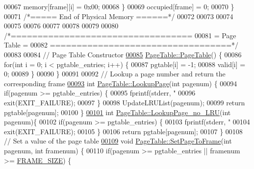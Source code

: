 \begin{DoxyCode}
{{{{00067         memory[frame][i] = 0x00;
00068     \}
00069     occupied[frame] = 0;
00070 \}
00071 \textcolor{comment}{/*=====  End of Physical Memory  ======*/}
00072 
00073 
00074 
00075 
00076 
00077 
00078 
00079 
00080 \textcolor{comment}{/*==================================}
00081 \textcolor{comment}{=            Page Table            =}
00082 \textcolor{comment}{==================================*/}
00083 
00084 \textcolor{comment}{// Page Table Constructor}
\hypertarget{memory_8cpp_source.tex_l00085}{}\hyperlink{classPageTable_a75c92e794fd3f5397d2499d54dac22c9}{00085} \hyperlink{classPageTable_a75c92e794fd3f5397d2499d54dac22c9}{PageTable::PageTable}() \{
00086     \textcolor{keywordflow}{for}(\textcolor{keywordtype}{int} i = 0; i < pgtable\_entries; i++) \{
00087         pgtable[i] = -1;
00088         valid[i] = 0;
00089     \}
00090 \}
00091 
00092 \textcolor{comment}{// Lookup a page number and return the corresponding frame}
\hypertarget{memory_8cpp_source.tex_l00093}{}\hyperlink{classPageTable_a2590af90445c76b97420da95cf7210ec}{00093} \textcolor{keywordtype}{int} \hyperlink{classPageTable_a2590af90445c76b97420da95cf7210ec}{PageTable::LookupPage}(\textcolor{keywordtype}{int} pagenum) \{
00094     \textcolor{keywordflow}{if}(pagenum >= pgtable\_entries) \{
00095         fprintf(stderr, \textcolor{stringliteral}{"%
00096         exit(EXIT\_FAILURE);
00097     \}
00098     UpdateLRUList(pagenum);
00099     \textcolor{keywordflow}{return} pgtable[pagenum];
00100 \}
\hypertarget{memory_8cpp_source.tex_l00101}{}\hyperlink{classPageTable_a3444b04644cb833bfd2a9b615704e6a1}{00101} \textcolor{keywordtype}{int} \hyperlink{classPageTable_a3444b04644cb833bfd2a9b615704e6a1}{PageTable::LookupPage\_no\_LRU}(\textcolor{keywordtype}{int} pagenum)\{
00102     \textcolor{keywordflow}{if}(pagenum >= pgtable\_entries) \{
00103         fprintf(stderr, \textcolor{stringliteral}{"%
00104         exit(EXIT\_FAILURE);
00105     \}
00106     \textcolor{keywordflow}{return} pgtable[pagenum];
00107 \}
00108 \textcolor{comment}{// Set a value of the page table}
\hypertarget{memory_8cpp_source.tex_l00109}{}\hyperlink{classPageTable_ac961a37f5dde09c3addce2fcd118f24d}{00109} \textcolor{keywordtype}{void} \hyperlink{classPageTable_ac961a37f5dde09c3addce2fcd118f24d}{PageTable::SetPageToFrame}(\textcolor{keywordtype}{int} pagenum, \textcolor{keywordtype}{int} framenum) \{
00110     \textcolor{keywordflow}{if}(pagenum >= pgtable\_entries || framenum >= \hyperlink{memory_8h_af9b1b2ba12857a4bf11289dac8c5462d}{FRAME\_SIZE}) \{
}}}}}}
\end{DoxyCode}

